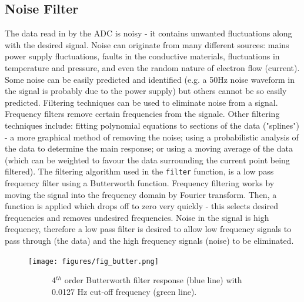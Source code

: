 \documentclass[twoside,a4]{report}
\def\br{\newline \newline \noindent}
\def\cbh{\large\bfseries !!! ??? !!! \normalsize\normalfont}
\begin{document}
	\subsection*{Noise Filter} %
	The data read in by the ADC is noisy - it contains unwanted fluctuations along with the desired signal. Noise can originate from many different sources: mains power supply fluctuations, faults in the conductive materials, fluctuations in temperature and pressure, and even the random nature of electron flow (current)\cite{wileyadvsignproc}. Some noise can be easily predicted and identified (e.g. a 50Hz noise waveform in the signal is probably due to the power supply) but others cannot be so easily predicted. 
	\br
	Filtering techniques can be used to eliminate noise from a signal. Frequency filters remove certain frequencies from the signale. Other filtering techniques include: fitting polynomial equations to sections of the data ("splines") - a more graphical method of removing the noise; using a probabilistic analysis of the data to determine the main response; or using a moving average of the data (which can be weighted to favour the data surrounding the current point being filtered).
	\br
	The filtering algorithm used in the \texttt{filter} function, is a low pass frequency filter using a Butterworth function. Frequency filtering works by moving the signal into the frequency domain by Fourier transform. Then, a function is applied which drops off to zero very quickly - this selects desired frequencies and removes undesired frequencies. Noise in the signal is high frequency, therefore a low pass filter is desired to allow low frequency signals to pass through (the data) and the high frequency signals (noise) to be eliminated.
	
	\begin{figure}[!htb]
		\centering
		\texttt{[image: figures/fig\_butter.png]}
		\caption{Frequency Domain Signal Response To Butterworth Function}
		\label{figbutter}
		\begin{subfigure}{0.8\textwidth}
			\centering
			{\footnotesize 4$^{th}$ order Butterworth filter response (blue line) with 0.0127 Hz cut-off frequency (green line).}
		\end{subfigure}
	\end{figure}
	
\end{document}
